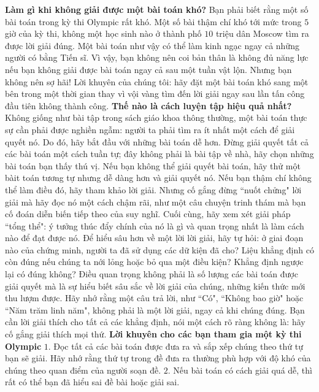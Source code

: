 \begin{multicols}{2}
	\vskip 0.1cm
	\textbf{\color{cackithi}Làm gì khi không giải được một bài toán khó?}
	\vskip 0.1cm 
	Bạn phải biết rằng một số bài toán trong kỳ thi Olympic rất khó. Một số bài thậm chí khó tới mức trong $5$ giờ của kỳ thi, không một học sinh nào ở thành phố $10$ triệu dân Moscow tìm ra được lời giải đúng. Một bài toán như vậy có thể làm kinh ngạc ngay cả những người có bằng Tiến sĩ. Vì vậy, bạn không nên coi bản thân là không đủ năng lực nếu bạn không giải được bài toán ngay cả sau một tuần vật lộn.
	\vskip 0.1cm
	Nhưng bạn không nên sợ hãi! Lời khuyên của chúng tôi: hãy đặt một bài toán khó sang một bên trong một thời gian thay vì vội vàng tìm đến lời giải ngay sau lần tấn công đầu tiên không thành công.
	\vskip 0.1cm
	\textbf{\color{cackithi}Thế nào là cách luyện tập hiệu quả nhất?}
	\vskip 0.1cm
	Không giống như bài tập trong sách giáo khoa thông thường, một bài toán thực sự cần phải được nghiền ngẫm: người ta phải tìm ra ít nhất một cách để giải quyết nó. Do đó, hãy bắt đầu với những bài toán dễ hơn. Đừng giải quyết tất cả các bài toán một cách tuần tự; đây không phải là bài tập về nhà, hãy chọn những bài toán bạn thấy thú vị.  Nếu bạn không thể giải quyết bài toán, hãy thử một bàit toán tương tự nhưng dễ dàng hơn và giải quyết nó. Nếu bạn thậm chí không thể làm điều đó, hãy tham khảo lời giải. Nhưng cố gắng đừng ``nuốt chửng" lời giải mà hãy đọc nó một cách chậm rãi, như một câu chuyện trinh thám mà bạn cố đoán diễn biến tiếp theo của suy nghĩ. Cuối cùng, hãy xem xét giải pháp ``tổng thể": ý tưởng thúc đẩy chính của nó là gì và quan trọng nhất là làm cách nào để đạt được nó.
	\vskip 0.1cm
	Để hiểu sâu hơn về một lời lời giải, hãy tự hỏi: ở giai đoạn nào của chứng minh, người ta đã sử dụng các dữ kiện đã cho? Liệu khẳng định có còn đúng nếu chúng ta nới lỏng hoặc bỏ qua một điều kiện? Khẳng định ngược lại có đúng không? Điều quan trọng không phải là số lượng các bài toán được giải quyết mà là sự hiểu biết sâu sắc về lời giải của chúng, những kiến thức mới thu lượm được. 
	\vskip 0.1cm
	Hãy nhớ rằng một câu trả lời, như ``Có", ``Không bao giờ" hoặc ``Năm trăm linh năm", không phải là một lời giải, ngay cả khi chúng đúng. Bạn cần lời giải thích cho tất cả các khẳng định, nói một cách rõ ràng không là: hãy cố gắng giải thích mọi thứ.  
	\vskip 0.1cm
	\textbf{\color{cackithi}Lời khuyên cho các bạn tham gia một kỳ thi Olympic}
	\vskip 0.1cm
	$1.$ Đọc tất cả các bài toán được đưa ra và sắp xếp chúng theo thứ tự bạn sẽ giải. Hãy nhớ rằng thứ tự trong đề đưa ra thường phù hợp với độ khó của chúng theo quan điểm của người soạn đề.
	\vskip 0.1cm
	$2.$ Nếu bài toán có cách giải quá dễ, thì rất có thể bạn đã hiểu sai đề bài hoặc giải sai.  

\end{multicols}
